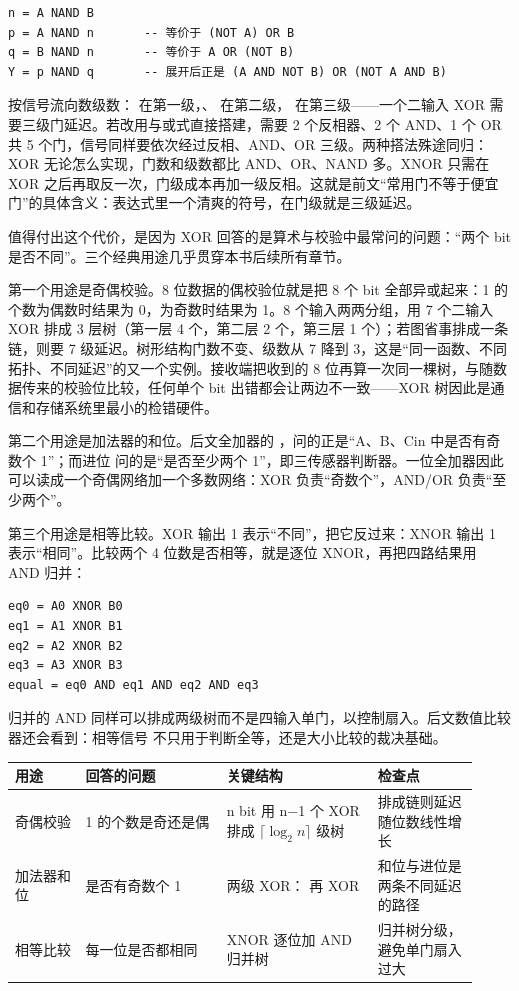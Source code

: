 \begin{lstlisting}
n = A NAND B
p = A NAND n       -- 等价于 (NOT A) OR B
q = B NAND n       -- 等价于 A OR (NOT B)
Y = p NAND q       -- 展开后正是 (A AND NOT B) OR (NOT A AND B)
\end{lstlisting}

按信号流向数级数： 在第一级，、 在第二级， 在第三级——一个二输入 XOR 需要三级门延迟。若改用与或式直接搭建，需要 2 个反相器、2 个 AND、1 个 OR 共 5 个门，信号同样要依次经过反相、AND、OR 三级。两种搭法殊途同归：XOR 无论怎么实现，门数和级数都比 AND、OR、NAND 多。XNOR 只需在 XOR 之后再取反一次，门级成本再加一级反相。这就是前文“常用门不等于便宜门”的具体含义：表达式里一个清爽的符号，在门级就是三级延迟。

值得付出这个代价，是因为 XOR 回答的是算术与校验中最常问的问题：“两个 bit 是否不同”。三个经典用途几乎贯穿本书后续所有章节。

第一个用途是奇偶校验。8 位数据的偶校验位就是把 8 个 bit 全部异或起来：1 的个数为偶数时结果为 0，为奇数时结果为 1。8 个输入两两分组，用 7 个二输入 XOR 排成 3 层树（第一层 4 个，第二层 2 个，第三层 1 个）；若图省事排成一条链，则要 7 级延迟。树形结构门数不变、级数从 7 降到 3，这是“同一函数、不同拓扑、不同延迟”的又一个实例。接收端把收到的 8 位再算一次同一棵树，与随数据传来的校验位比较，任何单个 bit 出错都会让两边不一致——XOR 树因此是通信和存储系统里最小的检错硬件。

第二个用途是加法器的和位。后文全加器的 ，问的正是“A、B、Cin 中是否有奇数个 1”；而进位  问的是“是否至少两个 1”，即三传感器判断器。一位全加器因此可以读成一个奇偶网络加一个多数网络：XOR 负责“奇数个”，AND/OR 负责“至少两个”。

第三个用途是相等比较。XOR 输出 1 表示“不同”，把它反过来：XNOR 输出 1 表示“相同”。比较两个 4 位数是否相等，就是逐位 XNOR，再把四路结果用 AND 归并：

\begin{lstlisting}
eq0 = A0 XNOR B0
eq1 = A1 XNOR B1
eq2 = A2 XNOR B2
eq3 = A3 XNOR B3
equal = eq0 AND eq1 AND eq2 AND eq3
\end{lstlisting}

归并的 AND 同样可以排成两级树而不是四输入单门，以控制扇入。后文数值比较器还会看到：相等信号  不只用于判断全等，还是大小比较的裁决基础。

\begin{longtable}{L{0.14\linewidth}L{0.28\linewidth}L{0.3\linewidth}L{0.2\linewidth}}
\toprule
用途 & 回答的问题 & 关键结构 & 检查点 \\
\midrule
奇偶校验 & 1 的个数是奇还是偶 & n bit 用 n$-$1 个 XOR 排成 $\lceil\log_2 n\rceil$ 级树 & 排成链则延迟随位数线性增长 \\\tablerowrule
加法器和位 & 是否有奇数个 1 & 两级 XOR： 再 XOR  & 和位与进位是两条不同延迟的路径 \\\tablerowrule
相等比较 & 每一位是否都相同 & XNOR 逐位加 AND 归并树 & 归并树分级，避免单门扇入过大 \\
\bottomrule
\end{longtable}

